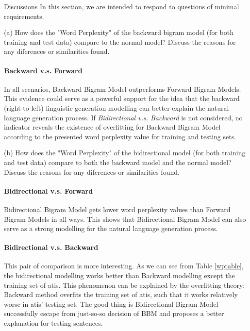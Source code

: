 \documentclass[11pt,a4paper]{article}
\begin{document}
\begin{section}{Discussions}
    In this section, we are intended to respond to questions of minimal
    requirements.

    (a) How does the "Word Perplexity" of the backward bigram model (for both
    training and test data) compare to the normal model? Discuss the reasons
    for any diferences or similarities found.
    \paragraph{Backward v.s. Forward} In all scenarios, Backward Bigram Model
    outperforms Forward Bigram Models. This evidence could serve as a powerful
    support for the idea that the backward (right-to-left) linguistic
    generation modelling can better explain the natural language generation
    process. If \textit{Bidirectional v.s. Backward} is not considered, no
    indicator reveals the existence of overfitting for Backward Bigram Model
    according to the presented word perplexity value for training and testing
    sets.

    \newpage
    (b) How does the "Word Perplexity" of the bidirectional model (for both
    training and test data) compare to both the backward model and the normal
    model? Discuss the reasons for any diferences or similarities found.
    \paragraph{Bidirectional v.s. Forward} Bidirectional Bigram Model gets
    lower word perplexity values than Forward Bigram Models in all ways. This
    shows that Bidirectional Bigram Model can also serve as a strong modelling
    for the natural language generation process. 

    \paragraph{Bidirectional v.s. Backward} This pair of comparison is more
    interesting. As we can see from Table \ref{wptable}, the bidirectional
    modelling works better than Backward modelling except the training set of
    atis. This phenomenon can be explained by the overfitting theory: Backward
    method overfits the training set of atis, such that it works relatively
    worse in atis' testing set. The good thing is Bidirectional Bigram Model
    successfully escape from just-so-so decision of BBM and proposes a better
    explanation for testing sentences.

\end{section}
\end{document}

